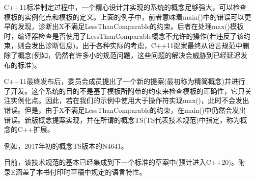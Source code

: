 C++11标准制定过程中，一个精心设计并实现的系统的概念足够强大，可以检查模板的实例化点和模板的定义。上面的例子中，前者意味着main()中的错误可以更早的发现，诊断出X不满足LessThanComparable的约束。后者在处理max()模板时，编译器检查是否使用了LessThanComparable概念不允许的操作(若违反了该约束，则会发出诊断信息)。出于各种实际的考虑，C++11提案最终从语言规范中删除了概念(例如，仍然有许多小的规范问题，这些问题的解决会威胁到已经延迟发布的标准)。

C++11最终发布后，委员会成员提出了一个新的提案(最初称为精简概念)并进行了开发。这个系统的目的不是基于模板所附带的约束来检查模板的正确性，它只关注实例化点。因此，若在我们的示例中使用大于操作符实现max()，此时不会发出错误。但是，由于X不满足LessThanComparable的约束，在main()中仍然会发出错误。新版概念提案实现，并在所谓的概念TS(TS代表技术规范)中指定，称为概念的C++扩展。

\begin{notice}例如，2017年初的概念TS版本的N4641。
\end{notice}

目前，该技术规范的基本已经集成到下一个标准的草案中(预计进入C++20)。附录E涵盖了本书付印时草稿中规定的语言特性。














































